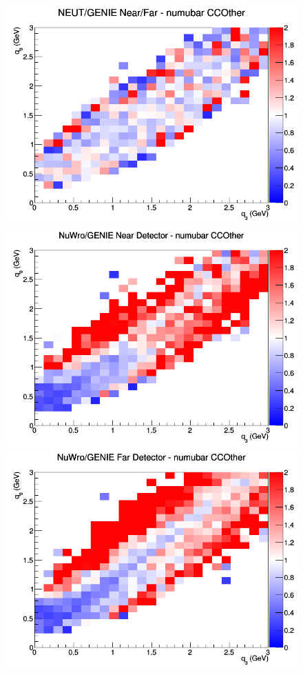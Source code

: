 \documentclass[12pt]{article}
\begin{document}
\begin{figure}[h]
\endminipage
{}
\includegraphics[width=\linewidth]{eff_q0_q3/GAr/ratios/CCOther_NEUT_GENIE_numubar_NF_q3_q0.png}
\endminipage
\newline
{}
\includegraphics[width=\linewidth]{eff_q0_q3/GAr/ratios/CCOther_NuWro_GENIE_numubar_near_q3_q0.png}
\endminipage
{}
\includegraphics[width=\linewidth]{eff_q0_q3/GAr/ratios/CCOther_NuWro_GENIE_numubar_far_q3_q0.png}

\end{figure}
\end{document}
